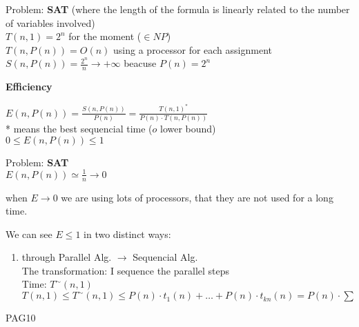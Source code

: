 Problem: \textbf{SAT} (where the length of the formula is linearly related to the number of variables involved)\\
$T(n,1) = 2^n$ for the moment ($ \in NP$)\\
$T(n, P(n)) = O(n)$ using a processor for each assignment\\
$S(n, P(n)) = \frac{2^n}{n} \rightarrow +\infty$ beacuse $P(n)=2^n$

\textbf{Efficiency}

$E(n, P(n)) = \frac{S(n, P(n))}{P(n)} = \frac{T(n,1)^*}{P(n) \cdot T(n, P(n))}$\\
* means the best sequencial time ($o$ lower bound)\\
$0 \leq E(n, P(n)) \leq 1$

Problem: \textbf{SAT}\\
$E(n, P(n)) \simeq \frac{1}{n} \rightarrow 0 $
\begin{remark}
 when $E \rightarrow 0$ we are using lots of processors, that they are not used for a long time. 
\end{remark}

We can see $E \leq 1$ in two distinct ways:

\begin{enumerate}
 \item through Parallel Alg. $\rightarrow$ Sequencial Alg.\\
 The transformation: I sequence the parallel steps\\
 Time: $T^{\sim}(n,1)$\\
 $T(n,1) \leq T^{\sim}(n,1) \leq P(n) \cdot t_1(n) + \dots + P(n) \cdot t_{kn}(n) = P(n) \cdot \sum$
\end{enumerate}

PAG10